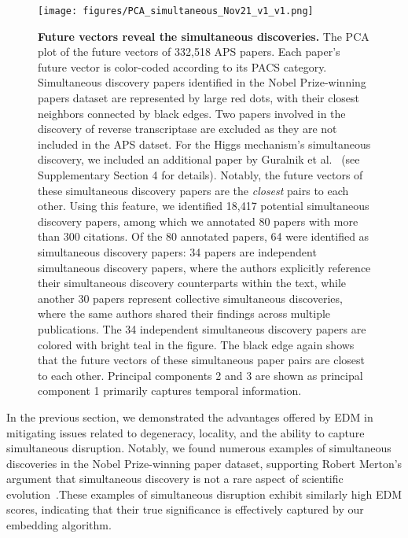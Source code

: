 \documentclass[12pt]{article}
\begin{document}
\begin{figure}
    \centering
\texttt{[image: figures/PCA\_simultaneous\_Nov21\_v1\_v1.png]}
  \caption{\textbf{Future vectors reveal the simultaneous discoveries.} The PCA plot of the future vectors of 332,518 APS papers. Each paper's future vector is color-coded according to its PACS category. Simultaneous discovery papers identified in the Nobel Prize-winning papers dataset are represented by large red dots, with their closest neighbors connected by black edges. Two papers involved in the discovery of reverse transcriptase are excluded as they are not included in the APS datset. For the Higgs mechanism's simultaneous discovery, we included an additional paper by Guralnik et al.~\cite{guralnik1964global} (see Supplementary Section 4 for details). Notably, the future vectors of these simultaneous discovery papers are the \emph{closest} pairs to each other. Using this feature, we identified 18,417 potential simultaneous discovery papers, among which we annotated 80 papers with more than 300 citations. Of the 80 annotated papers, 64 were identified as simultaneous discovery papers: 34 papers are independent simultaneous discovery papers, where the authors explicitly reference their simultaneous discovery counterparts within the text, while another 30 papers represent collective simultaneous discoveries, where the same authors shared their findings across multiple publications. The 34 independent simultaneous discovery papers are colored with bright teal in the figure. The black edge again shows that the future vectors of these simultaneous paper pairs are closest to each other. Principal components 2 and 3 are shown as principal component 1 primarily captures temporal information.}
    \label{fig:UMAP}
\end{figure}





In the previous section, we demonstrated the advantages offered by EDM in mitigating issues related to degeneracy, locality, and the ability to capture simultaneous disruption.  Notably, we found numerous examples of simultaneous discoveries in the Nobel Prize-winning paper dataset, supporting Robert Merton's argument that simultaneous discovery is not a rare aspect of scientific evolution~\cite{merton1961singletons}.These examples of simultaneous disruption exhibit similarly high EDM scores, indicating that their true significance is effectively captured by our embedding algorithm.
\end{document}
